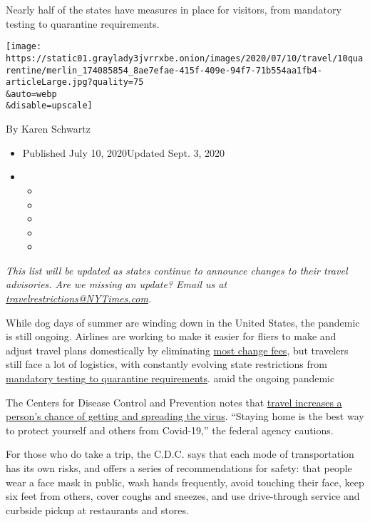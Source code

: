 Nearly half of the states have measures in place for visitors, from
mandatory testing to quarantine requirements.

\texttt{[image: https://static01.graylady3jvrrxbe.onion/images/2020/07/10/travel/10quarentine/merlin\_174085854\_8ae7efae-415f-409e-94f7-71b554aa1fb4-articleLarge.jpg?quality=75\\\&auto=webp\\\&disable=upscale]}

By Karen Schwartz

\begin{itemize}
\item
  Published July 10, 2020Updated Sept. 3, 2020
\item
  \begin{itemize}
  \item
  \item
  \item
  \item
  \item
  \end{itemize}
\end{itemize}

\emph{This list will be updated as states continue to announce changes
to their travel advisories. Are we missing an update? Email us at}
\href{mailto:travelrestrictions@NYTimes.com}{\emph{travelrestrictions@NYTimes.com}}\emph{.}

While dog days of summer are winding down in the United States, the
pandemic is still ongoing. Airlines are working to make it easier for
fliers to make and adjust travel plans domestically by eliminating
\href{https://www.nytimes3xbfgragh.onion/aponline/2020/08/31/business/bc-us-airlines-change-fees.html}{most
change fees}, but travelers still face a lot of logistics, with
constantly evolving state restrictions from
\href{https://www.cdc.gov/quarantine/index.html}{mandatory testing to
quarantine requirements}. amid the ongoing pandemic

The Centers for Disease Control and Prevention notes that
\href{https://www.cdc.gov/coronavirus/2019-ncov/travelers/travel-during-covid19.html?CDC_AA_refVal=https\%3A\%2F\%2Fwww.cdc.gov\%2Fcoronavirus\%2F2019-ncov\%2Ftravelers\%2Ftravel-in-the-us.html}{travel
increases a person's chance of getting and spreading the virus}.
``Staying home is the best way to protect yourself and others from
Covid-19,'' the federal agency cautions.

For those who do take a trip, the C.D.C. says that each mode of
transportation has its own risks, and offers a series of recommendations
for safety: that people wear a face mask in public, wash hands
frequently, avoid touching their face, keep six feet from others, cover
coughs and sneezes, and use drive-through service and curbside pickup at
restaurants and stores.

